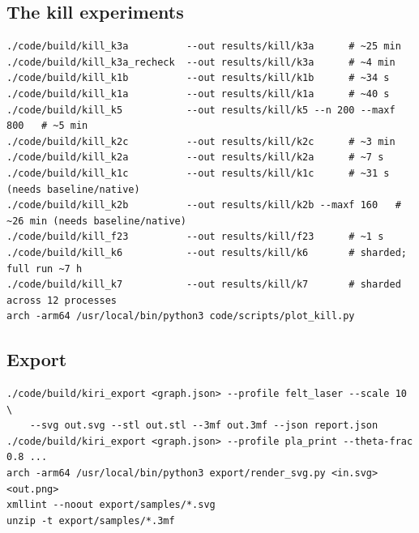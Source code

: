 \documentclass[10pt,a4paper]{article}
\begin{document}
\subsection*{The kill experiments}
\begin{lstlisting}
./code/build/kill_k3a          --out results/kill/k3a      # ~25 min
./code/build/kill_k3a_recheck  --out results/kill/k3a      # ~4 min
./code/build/kill_k1b          --out results/kill/k1b      # ~34 s
./code/build/kill_k1a          --out results/kill/k1a      # ~40 s
./code/build/kill_k5           --out results/kill/k5 --n 200 --maxf 800   # ~5 min
./code/build/kill_k2c          --out results/kill/k2c      # ~3 min
./code/build/kill_k2a          --out results/kill/k2a      # ~7 s
./code/build/kill_k1c          --out results/kill/k1c      # ~31 s  (needs baseline/native)
./code/build/kill_k2b          --out results/kill/k2b --maxf 160   # ~26 min (needs baseline/native)
./code/build/kill_f23          --out results/kill/f23      # ~1 s
./code/build/kill_k6           --out results/kill/k6       # sharded; full run ~7 h
./code/build/kill_k7           --out results/kill/k7       # sharded across 12 processes
arch -arm64 /usr/local/bin/python3 code/scripts/plot_kill.py
\end{lstlisting}

\subsection*{Export}
\begin{lstlisting}
./code/build/kiri_export <graph.json> --profile felt_laser --scale 10 \
    --svg out.svg --stl out.stl --3mf out.3mf --json report.json
./code/build/kiri_export <graph.json> --profile pla_print --theta-frac 0.8 ...
arch -arm64 /usr/local/bin/python3 export/render_svg.py <in.svg> <out.png>
xmllint --noout export/samples/*.svg
unzip -t export/samples/*.3mf
\end{lstlisting}
\end{document}
